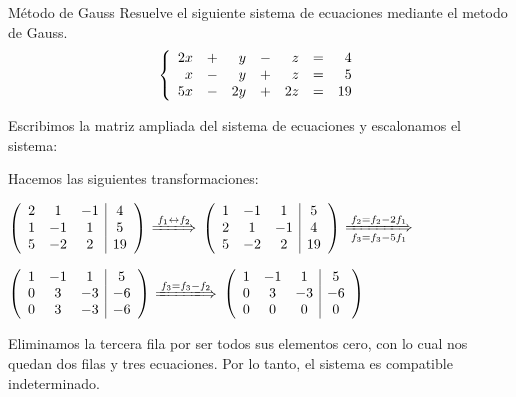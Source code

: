 \documentclass[9pt]{beamer}
\newenvironment{matrizampliada}{\left( \begin{array}{ccc|c}}{\end{array} \right)}
\newenvironment{sistematres}{\left\lbrace \begin{array}{rrrrrrr}}{\end{array} \right.}
\begin{document}
\begin{frame}	

\begin{exampleblock}{Método de Gauss}
Resuelve el siguiente sistema de ecuaciones mediante el metodo de Gauss.
\[ 
\begin{sistematres} 
	2x&+&y&-&z&=&4 \\
	x&-&y&+&z&=&5 \\
	5x&-&2y&+&2z&=&19 \\
\end{sistematres}
\]	
\end{exampleblock}

\pause
Escribimos la matriz ampliada del sistema de ecuaciones y escalonamos el sistema:

Hacemos las siguientes transformaciones:
\pause

$\begin{matrizampliada}
	2 & 1 & -1 & 4 \\
	1 & -1 & 1 & 5 \\
	5 & -2 & 2 & 19 
\end{matrizampliada}$
\pause
$\xLongrightarrow{f_1\leftrightarrow f_2}$
\pause
$\begin{matrizampliada}
	1 & -1 & 1 & 5 \\
	2 & 1 & -1 & 4 \\
	5 & -2 & 2 & 19 
\end{matrizampliada}$
\pause
$\xLongrightarrow[f_3=f_3-5f_1]{f_2=f_2-2f_1}$

\pause
$\begin{matrizampliada}
	1 & -1 & 1 & 5 \\
	0 & 3 & -3 & -6 \\
	0 & 3 & -3 & -6 
\end{matrizampliada}$
\pause
$\xLongrightarrow{f_3=f_3-f_2}$
\pause
$\begin{matrizampliada}
	1 & -1 & 1 & 5 \\
	0 & 3 & -3 & -6 \\
	0 & 0 & 0 & 0 
\end{matrizampliada}$
\pause

Eliminamos la tercera fila por ser todos sus elementos cero, con lo cual nos quedan dos filas y tres ecuaciones. Por lo tanto, el sistema es compatible indeterminado.
\end{frame}
\end{document}
